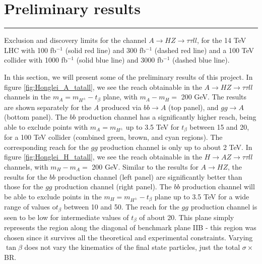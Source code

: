 {\section{Preliminary results}\label{sec:exo_higgs_results}
\begin{marginfigure}[1.1in]
\centering
{\color{gray}\hrule}\vspace{\onelineskip}
  \caption{Exclusion and discovery limits for the channel $A\rightarrow HZ\rightarrow \tau\tau ll$, for the 14 TeV LHC with 100 fb$^{-1}$ (solid red line) and 300 fb$^{-1}$ (dashed red line) and a 100 TeV collider with 1000 fb$^{-1}$ (solid blue line) and 3000 fb$^{-1}$ (dashed blue line).}
  \vspace{\onelineskip}{\color{gray}\hrule}
\label{fig:Honglei_A_tatall}
\end{marginfigure}
In this section, we will present some of the preliminary results of this project. In figure \ref{fig:Honglei_A_tatall}, we see the reach obtainable in the $A\rightarrow HZ\rightarrow \tau\tau ll$ channels in the $m_A = m_{H^\pm} - t_\beta$ plane, with $m_A - m_H = $ 200 GeV. The results are shown separately for the \emph{A} produced via $bb\rightarrow A$ (top panel), and $gg\rightarrow A$ (bottom panel). The $bb$ production channel has a significantly higher reach, being able to exclude points with $m_A = m_{H^\pm}$ up to 3.5 TeV for $t_\beta$ between 15 and 20, for a 100 TeV collider (combined green, brown, and cyan regions). The corresponding reach for the $gg$ production channel is only up to about 2 TeV. In figure \ref{fig:Honglei_H_tatall}, we see the reach obtainable in the $H\rightarrow AZ\rightarrow \tau\tau ll$ channels, with $m_H - m_A =$ 200 GeV. Similar to the results for $A\rightarrow HZ$, the results for the $bb$ production channel (left panel) are significantly better than those for the $gg$ production channel (right panel). The $bb$ production channel will be able to exclude points in the $m_H = m_{H^\pm} - t_\beta$ plane up to 3.5 TeV for a wide range of values o$t_\beta$ between 10 and 50. The reach for the $gg$ production channel is seen to be low for intermediate values of $t_\beta$ of about 20. This plane simply represents the region along the diagonal of benchmark plane IIB - this region was chosen since it survives all the theoretical and experimental constraints. Varying $\tan\beta$ does not vary the kinematics of the final state particles, just the total $\sigma\times$BR. 
}
